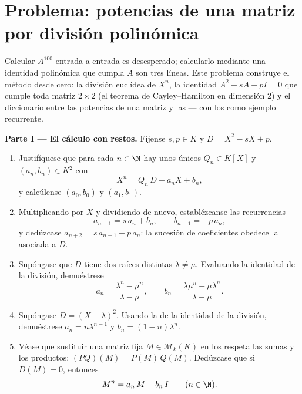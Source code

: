 \section{Problema: potencias de una matriz por división polinómica}

\begin{problem}\label{pb:b1:matrices:1}
Calcular $A^{100}$ entrada a entrada es desesperado; calcularlo
mediante una identidad polinómica que cumpla $A$ son tres líneas.
Este problema construye el método desde cero: la división euclídea de
$X^n$, la identidad $A^2 - sA + pI = 0$ que cumple toda matriz
$2 \times 2$ (el teorema de Cayley--Hamilton en dimensión $2$) y el
diccionario entre las potencias de una matriz y las
 --- con los  como ejemplo
recurrente.

\medskip
\noindent\textbf{Parte I --- El cálculo con restos.} Fíjense
$s, p \in K$ y $D = X^2 - sX + p$.
\begin{enumerate}
  \item Justifíquese que para cada $n \in \N$ hay unos únicos
        $Q_n \in K[X]$ y $(a_n, b_n) \in K^2$ con
        \[
        X^n = Q_n\,D + a_n X + b_n ,
        \]
        y calcúlense $(a_0, b_0)$ y $(a_1, b_1)$.
  \item Multiplicando por $X$ y dividiendo de nuevo, establézcanse
        las recurrencias
        \[
        a_{n+1} = s\,a_n + b_n,
        \qquad
        b_{n+1} = -p\,a_n ,
        \]
        y dedúzcase $a_{n+2} = s\,a_{n+1} - p\,a_n$: la sucesión de
        coeficientes obedece la  asociada a $D$.
  \item Supóngase que $D$ tiene dos raíces distintas
        $\lambda \neq \mu$. Evaluando la identidad de la división,
        demuéstrese
        \[
        a_n = \frac{\lambda^n - \mu^n}{\lambda - \mu},
        \qquad
        b_n = \frac{\lambda\mu^n - \mu\lambda^n}{\lambda - \mu} .
        \]
  \item Supóngase $D = (X - \lambda)^2$. Usando la  de la
        identidad de la división, demuéstrese $a_n = n\lambda^{n-1}$
        y $b_n = (1 - n)\lambda^{n}$.
  \item Véase que sustituir una matriz fija
        $M \in \mathcal{M}_k(K)$ en los  respeta las sumas
        y los productos: $(PQ)(M) = P(M)\,Q(M)$. Dedúzcase que si
        $D(M) = 0$, entonces
        \[
        M^n = a_n\,M + b_n\,I \qquad (n \in \N).
        \]
\end{enumerate}


\end{problem}

